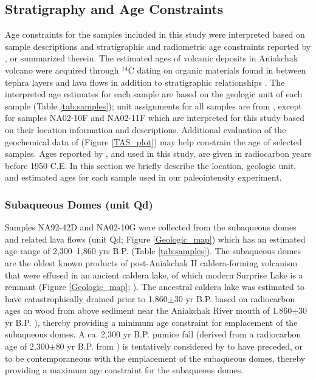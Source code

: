 \documentclass[draft]{agujournal2019}
\begin{document}
\subsection{Stratigraphy and Age Constraints}
Age constraints for the samples included in this study were interpreted based on sample descriptions and stratigraphic and radiometric age constraints reported by , or summarized therein. The estimated ages of volcanic deposits in Aniakchak volcano were acquired through $^{14}$C dating on organic materials found in between tephra layers and lava flows in addition to stratigraphic relationships \cite{Bacon2014a}. The interpreted age estimates for each sample are based on the geologic unit of each sample (Table \ref{tab:samples}); unit assignments for all samples are from , except for samples NA02-10F and NA02-11F which are interpreted for this study based on their location information and descriptions. Additional evaluation of the geochemical data of  (Figure \ref{TAS_plot}) may help constrain the age of selected samples. Ages reported by , and used in this study, are given in radiocarbon years before 1950 C.E. In this section we briefly describe the location, geologic unit, and estimated ages for each sample used in our paleointensity experiment. 

\subsubsection{Subaqueous Domes (unit Qd)}
Samples NA92-42D and NA02-10G were collected from the subaqueous domes and related lava flows (unit Qd; Figure \ref{Geologic_map}) which has an estimated age range of 2,300–1,860 yrs B.P. (Table \ref{tab:samples}). The subaqueous domes are the oldest known products of post-Aniakchak II caldera-forming volcanism that were effused in an ancient caldera lake, of which modern Surprise Lake is a remnant (Figure \ref{Geologic_map}; ). The ancestral caldera lake was estimated to have catastrophically drained prior to 1,860$\pm$30 yr B.P. based on radiocarbon ages on wood from above sediment near the Aniakchak River mouth of 1,860$\pm$30 yr B.P. \cite{Vanderhoek2004a,Bacon2014a}), thereby providing a minimum age constraint for emplacement of the subaqueous domes. A ca. 2,300 yr B.P. pumice fall (derived from a radiocarbon age of 2,300$\pm$80 yr B.P. from ) is tentatively considered by  to have preceded, or to be contemporaneous with the emplacement of the subaqueous domes, thereby providing a maximum age constraint for the subaqueous domes.
\end{document}
